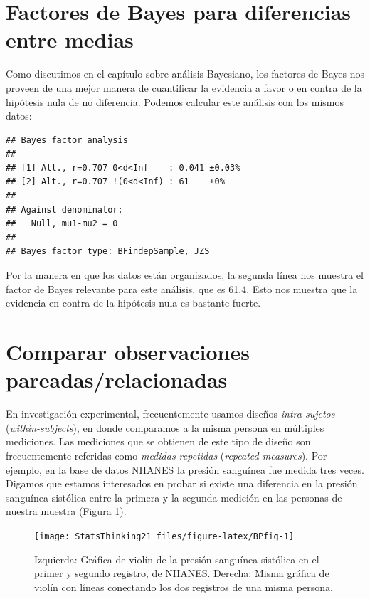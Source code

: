 \documentclass[
  12pt,
]{book}
\theoremstyle{definition}
\theoremstyle{definition}
\theoremstyle{definition}
\theoremstyle{remark}
\begin{document}
\hypertarget{factores-de-bayes-para-diferencias-entre-medias}{%
\section{Factores de Bayes para diferencias entre medias}\label{factores-de-bayes-para-diferencias-entre-medias}}

Como discutimos en el capítulo sobre análisis Bayesiano, los factores de Bayes nos proveen de una mejor manera de cuantificar la evidencia a favor o en contra de la hipótesis nula de no diferencia. Podemos calcular este análisis con los mismos datos:

\begin{verbatim}
## Bayes factor analysis
## --------------
## [1] Alt., r=0.707 0<d<Inf    : 0.041 ±0.03%
## [2] Alt., r=0.707 !(0<d<Inf) : 61    ±0%
## 
## Against denominator:
##   Null, mu1-mu2 = 0 
## ---
## Bayes factor type: BFindepSample, JZS
\end{verbatim}

Por la manera en que los datos están organizados, la segunda línea nos muestra el factor de Bayes relevante para este análisis, que es 61.4. Esto nos muestra que la evidencia en contra de la hipótesis nula es bastante fuerte.

\hypertarget{paired-ttests}{%
\section{Comparar observaciones pareadas/relacionadas}\label{paired-ttests}}

En investigación experimental, frecuentemente usamos diseños \emph{intra-sujetos} (\emph{within-subjects}), en donde comparamos a la misma persona en múltiples mediciones. Las mediciones que se obtienen de este tipo de diseño son frecuentemente referidas como \emph{medidas repetidas} (\emph{repeated measures}). Por ejemplo, en la base de datos NHANES la presión sanguínea fue medida tres veces. Digamos que estamos interesados en probar si existe una diferencia en la presión sanguínea sistólica entre la primera y la segunda medición en las personas de nuestra muestra (Figura \ref{fig:BPfig}).

\begin{figure}
\texttt{[image: StatsThinking21\_files/figure-latex/BPfig-1]} \caption{Izquierda: Gráfica de violín de la presión sanguínea sistólica en el primer y segundo registro, de NHANES. Derecha: Misma gráfica de violín con líneas conectando los dos registros de una misma persona.}\label{fig:BPfig}
\end{figure}
\end{document}
